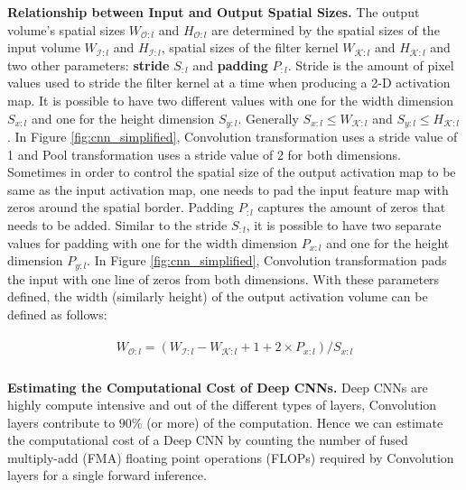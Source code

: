 \vspace{2mm}
\noindent \textbf{Relationship between Input and Output Spatial Sizes.}
The output volume's spatial sizes $W_{\mathcal{O}:l}$ and $H_{\mathcal{O}:l}$ are determined by the spatial sizes of the input volume $W_{\mathcal{I}:l}$ and $H_{\mathcal{I}:l}$, spatial sizes of the filter kernel $W_{\mathcal{K}:l}$ and $H_{\mathcal{K}:l}$ and two other parameters: \textbf{stride} $S_{:l}$ and \textbf{padding} $P_{:l}$.
Stride is the amount of pixel values used to stride the filter kernel at a time when producing a 2-D activation map.
It is possible to have two different values with one for the width dimension $S_{x:l}$ and one for the height dimension $S_{y:l}$.
Generally $S_{x:l} \leq W_{\mathcal{K}:l}$ and $S_{y:l} \leq H_{\mathcal{K}:l}$.
In Figure \ref{fig:cnn_simplified}, Convolution transformation uses a stride value of 1 and Pool transformation uses a stride value of 2 for both dimensions.
Sometimes in order to control the spatial size of the output activation map to be same as the input activation map, one needs to pad the input feature map with zeros around the spatial border.
Padding $P_{:l}$ captures the amount of zeros that needs to be added.
Similar to the stride $S_{:l}$, it is possible to have two separate values for padding with one for the width dimension $P_{x:l}$ and one for the height dimension $P_{y:l}$.
In Figure \ref{fig:cnn_simplified}, Convolution transformation pads the input with one line of zeros from both dimensions.
With these parameters defined, the width (similarly height) of the output activation volume can be defined as follows:

\begin{align}
\begin{split}
W_{\mathcal{O}:l} = (W_{\mathcal{I}:l} - W_{\mathcal{K}:l} + 1 + 2\times P_{x:l})/S_{x:l} \\
\end{split}
\end{align}

\vspace{2mm}
\noindent \textbf{Estimating the Computational Cost of Deep CNNs.}
Deep CNNs are highly compute intensive and out of the different types of layers, Convolution layers contribute to $90\%$ (or more) of the computation.
Hence we can estimate the computational cost of a Deep CNN by counting the number of fused multiply-add (FMA) floating point operations (FLOPs) required by Convolution layers for a single forward inference.

